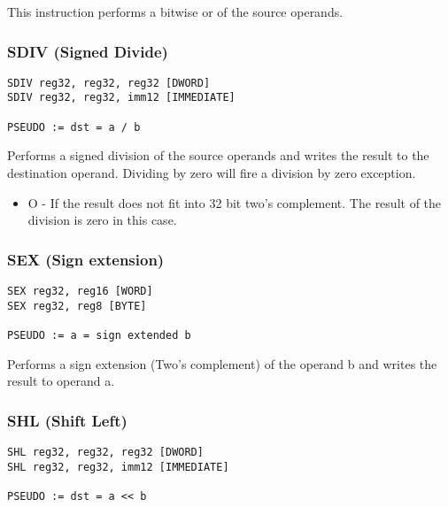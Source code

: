 
This instruction performs a bitwise or of the source operands.

\subsubsection{SDIV (Signed Divide)}

\begin{verbatim}
SDIV reg32, reg32, reg32 [DWORD]
SDIV reg32, reg32, imm12 [IMMEDIATE]

PSEUDO := dst = a / b
\end{verbatim}


Performs a signed division of the source operands and writes the result to the destination operand. Dividing by zero will fire a division by zero exception.


\begin{itemize}
        \item   O - If the result does not fit into 32 bit two's complement. The result of the division is zero in this case.
\end{itemize}

\subsubsection{SEX (Sign extension)}

\begin{verbatim}
SEX reg32, reg16 [WORD]
SEX reg32, reg8 [BYTE]

PSEUDO := a = sign extended b
\end{verbatim}


Performs a sign extension (Two's complement) of the operand b and writes the result to operand a. 


\subsubsection{SHL (Shift Left)}

\begin{verbatim}
SHL reg32, reg32, reg32 [DWORD]
SHL reg32, reg32, imm12 [IMMEDIATE]

PSEUDO := dst = a << b
\end{verbatim}


